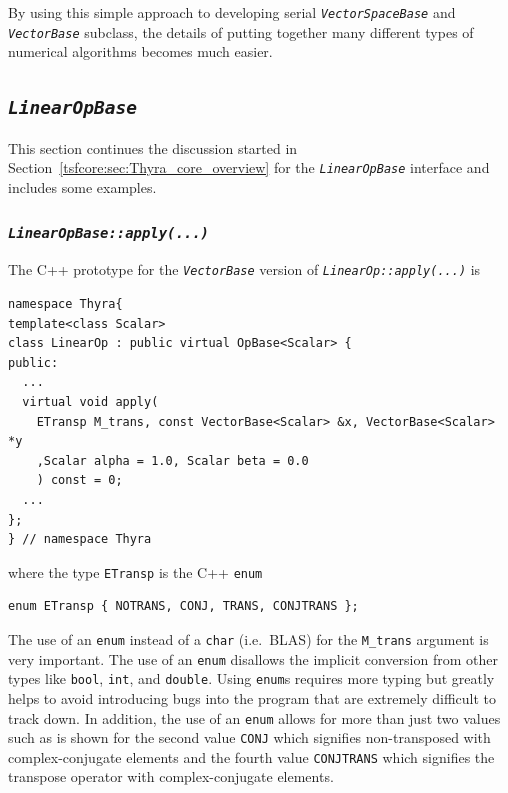 \documentclass[pdf,ps2pdf,11pt]{SANDreport}
\begin{document}
By using this simple approach to developing serial
{}\texttt{\textit{Vector\-Space\-Base}} and {}\texttt{\textit{Vector\-Base}}
subclass, the details of putting together many different types of
numerical algorithms becomes much easier.

%
\subsection{\texttt{\textit{Linear\-Op\-Base}}}
\label{tsfcore:sec:linear_op}
%

This section continues the discussion started in
Section~\ref{tsfcore:sec:Thyra_core_overview} for the
{}\texttt{\textit{Linear\-Op\-Base}} interface and includes some examples.

%
\subsubsection{\texttt{\textit{LinearOpBase::apply(\-...)}}}
\label{tsfcore:sec:linear_op_apply}
%

The C++ prototype for the {}\texttt{\textit{Vector\-Base}} version of
{}\texttt{\textit{LinearOp\-::apply(\-...)}} is

{\scriptsize\begin{verbatim}
namespace Thyra{
template<class Scalar>
class LinearOp : public virtual OpBase<Scalar> {
public:
  ...
  virtual void apply(
    ETransp M_trans, const VectorBase<Scalar> &x, VectorBase<Scalar> *y
    ,Scalar alpha = 1.0, Scalar beta = 0.0
    ) const = 0;
  ...
};
} // namespace Thyra
\end{verbatim}}

{}\noindent{}where the type {}\texttt{ETransp} is the C++
{}\texttt{enum}

{\scriptsize\begin{verbatim}
enum ETransp { NOTRANS, CONJ, TRANS, CONJTRANS };
\end{verbatim}}

{}\noindent{}The use of an {}\texttt{enum} instead of a {}\texttt{char} (i.e.\
BLAS) for the {}\texttt{M\_trans} argument is very important.  The use of an
{}\texttt{enum} disallows the implicit conversion from other types like
{}\texttt{bool}, {}\texttt{int}, and {}\texttt{double}.  Using
{}\texttt{enum}s requires more typing but greatly helps to avoid introducing
bugs into the program that are extremely difficult to track down.  In
addition, the use of an {}\texttt{enum} allows for more than just two values
such as is shown for the second value {}\texttt{CONJ} which signifies
non-transposed with complex-conjugate elements and the fourth value
{}\texttt{CONJTRANS} which signifies the transpose operator with
complex-conjugate elements.
\end{document}
